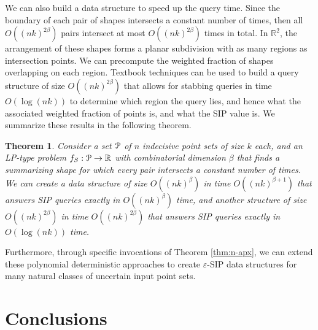 \documentclass{journal}
\newcommand{\eps}{\varepsilon}
\newcommand{\Eu}[1]{\ensuremath{\EuScript{#1}}}
\renewcommand{\b}[1]{\ensuremath{\mathbb{#1}}}
\newcommand{\R}{\ensuremath{\mathbb{R}}}
\newtheorem {theorem}{Theorem}[section]
\begin{document}
We can also build a data structure to speed up the query time.  Since the boundary of each pair of shapes intersects a constant number of times, then all $O((nk)^{2\beta})$ pairs intersect at most $O((nk)^{2\beta})$ times in total.  In $\b{R}^2$, the arrangement of these shapes forms a planar subdivision with as many regions as intersection points.  We can precompute the weighted fraction of shapes overlapping on each region.  Textbook techniques can be used to build a query structure of size $O((nk)^{2\beta})$ that allows for stabbing queries in time $O(\log(nk))$ to determine which region the query lies, and hence what the associated weighted fraction of points is, and what the SIP value is.  
We summarize these results in the following theorem.  

\begin{theorem}
Consider a set $\Eu P$ of $n$ indecisive point sets of size $k$ each, and an LP-type problem $f_S : \Eu P \to \R$ with combinatorial dimension $\beta$ that finds a summarizing shape for which every pair intersects a constant number of times.  
We can create a data structure of size $O((nk)^\beta)$ in time $O((nk)^{\beta+1})$ that answers SIP queries exactly in $O((nk)^\beta)$ time, 
and another structure of size $O((nk)^{2\beta})$ in time $O((nk)^{2\beta})$ that answers SIP queries exactly in $O(\log(nk))$ time.  
\end{theorem}


Furthermore, through specific invocations of Theorem \ref{thm:n-apx}, we can extend these polynomial deterministic approaches to create $\eps$-SIP data structures for many natural classes of uncertain input point sets.  

































\section {Conclusions}
\end{document}
